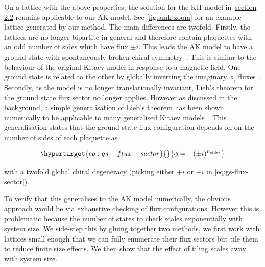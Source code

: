 On a lattice with the above properties, the solution for the KH model in~\protect\hyperlink{bg-hkm-model}{section 2.2} remains applicable to our AK model. See \cref{fig:amk-zoom} for an example lattice generated by our method. The main differences are twofold. Firstly, the lattices are no longer bipartite in general and therefore contain plaquettes with an odd number of sides which have flux \(\pm i\). This leads the AK model to have a ground state with spontaneously broken chiral symmetry~\autocite{Chua2011,yaoExactChiralSpin2007,ChuaPRB2011,Fiete2012,Natori2016,Wu2009,Peri2020,WangHaoranPRB2021}. This is similar to the behaviour of the original Kitaev model in response to a magnetic field. One ground state is related to the other by globally inverting the imaginary \(\phi_i\) fluxes~\autocite{yaoExactChiralSpin2007}. Secondly, as the model is no longer translationally invariant, Lieb's theorem for the ground state flux sector no longer applies. However as discussed in the background, a simple generalisation of Lieb's theorem has been shown numerically to be applicable to many generalised Kitaev models~\autocite{eschmannThermodynamicClassificationThreedimensional2020,Yao2009,eschmann2019thermodynamics,Peri2020}. This generalisation states that the ground state flux configuration depends on on the number of sides of each plaquette as

\begin{equation}\protect\hypertarget{eq:gs-flux-sector}{}{\phi = -(\pm i)^{n_{\mathrm{sides}}}}\label{eq:gs-flux-sector}\end{equation}

with a twofold global chiral degeneracy (picking either \(+i\) or \(-i\) in \cref{eq:gs-flux-sector}).

To verify that this generalises to the AK model numerically, the obvious approach would be via exhaustive checking of flux configurations. However this is problematic because the number of states to check scales exponentially with system size. We side-step this by gluing together two methods, we first work with lattices small enough that we can fully enumerate their flux sectors but tile them to reduce finite size effects. We then show that the effect of tiling scales away with system size.

